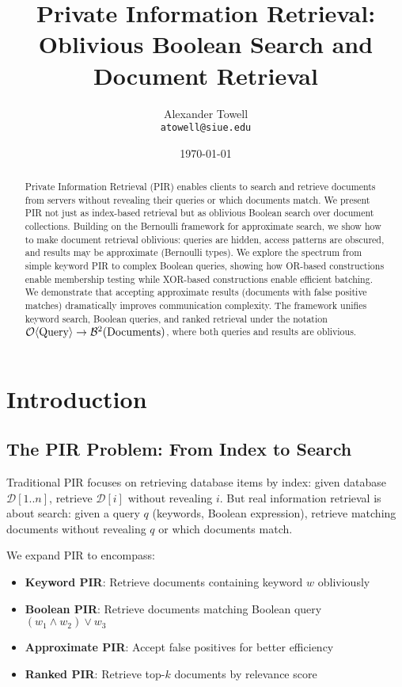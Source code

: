 \documentclass[11pt,final,hidelinks]{article}
\title{Private Information Retrieval: Oblivious Boolean Search and Document Retrieval}
\author{
    Alexander Towell\\
    \texttt{atowell@siue.edu}
}
\date{\today}
\newcommand{\DB}{\mathcal{D}}
\begin{document}
\maketitle

\begin{abstract}
Private Information Retrieval (PIR) enables clients to search and retrieve documents from servers without revealing their queries or which documents match. We present PIR not just as index-based retrieval but as oblivious Boolean search over document collections. Building on the Bernoulli framework for approximate search, we show how to make document retrieval oblivious: queries are hidden, access patterns are obscured, and results may be approximate (Bernoulli types). We explore the spectrum from simple keyword PIR to complex Boolean queries, showing how OR-based constructions enable membership testing while XOR-based constructions enable efficient batching. We demonstrate that accepting approximate results (documents with false positive matches) dramatically improves communication complexity. The framework unifies keyword search, Boolean queries, and ranked retrieval under the notation $\Obv{\text{Query}} \to \Bernoulli{\text{Documents}}{2}$, where both queries and results are oblivious.
\end{abstract}

\ObliviousNotationGuide

\section{Introduction}

\subsection{The PIR Problem: From Index to Search}

Traditional PIR focuses on retrieving database items by index: given database $\DB[1..n]$, retrieve $\DB[i]$ without revealing $i$. But real information retrieval is about search: given a query $q$ (keywords, Boolean expression), retrieve matching documents without revealing $q$ or which documents match.

We expand PIR to encompass:
\begin{itemize}
    \item \textbf{Keyword PIR}: Retrieve documents containing keyword $w$ obliviously
    \item \textbf{Boolean PIR}: Retrieve documents matching Boolean query $(w_1 \land w_2) \lor w_3$
    \item \textbf{Approximate PIR}: Accept false positives for better efficiency
    \item \textbf{Ranked PIR}: Retrieve top-$k$ documents by relevance score
\end{itemize}
\end{document}
